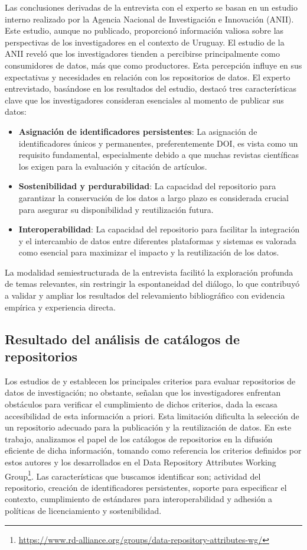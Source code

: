\documentclass[runningheads]{llncs}
\begin{document}
Las conclusiones derivadas de la entrevista con el experto se basan en un estudio interno realizado por la Agencia Nacional de Investigación e Innovación (ANII). Este estudio, aunque no publicado, proporcionó información valiosa sobre las perspectivas de los investigadores en el contexto de Uruguay.
El estudio de la ANII reveló que los investigadores tienden a percibirse principalmente como consumidores de datos, más que como productores. Esta percepción influye en sus expectativas y necesidades en relación con los repositorios de datos.
El experto entrevistado, basándose en los resultados del estudio, destacó tres características clave que los investigadores consideran esenciales al momento de publicar sus datos:
\begin{itemize}
    \item \textbf{Asignación de identificadores persistentes}: La asignación de identificadores únicos y permanentes, preferentemente DOI, es vista como un requisito fundamental, especialmente debido a que muchas revistas científicas los exigen para la evaluación y citación de artículos.
    \item \textbf{Sostenibilidad y perdurabilidad}: La capacidad del repositorio para garantizar la conservación de los datos a largo plazo es considerada crucial para asegurar su disponibilidad y reutilización futura.
    \item \textbf{Interoperabilidad}: La capacidad del repositorio para facilitar la integración y el intercambio de datos entre diferentes plataformas y sistemas es valorada como esencial para maximizar el impacto y la reutilización de los datos.
\end{itemize}

La modalidad semiestructurada de la entrevista facilitó la exploración profunda de temas relevantes, sin restringir la espontaneidad del diálogo, lo que contribuyó a validar y ampliar los resultados del relevamiento bibliográfico con evidencia empírica y experiencia directa.

\subsection{Resultado del análisis de catálogos de repositorios}
Los estudios de \citep{witt_2024_11221855} y \citep{Jia25} establecen los principales criterios para evaluar repositorios de datos de investigación; no obstante, señalan que los investigadores enfrentan obstáculos para verificar el cumplimiento de dichos criterios, dada la escasa accesibilidad de esta información a priori. Esta limitación dificulta la selección de un repositorio adecuado para la publicación y la reutilización de datos. En este trabajo, analizamos el papel de los catálogos de repositorios en la difusión eficiente de dicha información, tomando como referencia los criterios definidos por estos autores y los desarrollados en el Data Repository Attributes Working Group\footnote{\url{https://www.rd-alliance.org/groups/data-repository-attributes-wg/}}.
Las características que buscamos identificar son; actividad del repositorio, creación de identificadores persistentes, soporte para especificar el contexto, cumplimiento de estándares para interoperabilidad y adhesión a políticas de licenciamiento y sostenibilidad.
\end{document}
